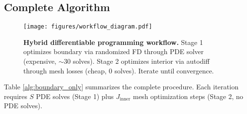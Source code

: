 \documentclass{article}
\begin{document}
\subsection{Complete Algorithm}

\begin{figure}[t]
\centering
\texttt{[image: figures/workflow\_diagram.pdf]}
\caption{\textbf{Hybrid differentiable programming workflow.} Stage 1 optimizes boundary via randomized FD through PDE solver (expensive, $\sim$30 solves). Stage 2 optimizes interior via autodiff through mesh losses (cheap, 0 solves). Iterate until convergence.}
\label{fig:workflow}
\end{figure}

Table \ref{alg:boundary_only} summarizes the complete procedure. Each iteration requires $S$ PDE solves (Stage 1) plus $J_{\text{inner}}$ mesh optimization steps (Stage 2, no PDE solves).
\end{document}
